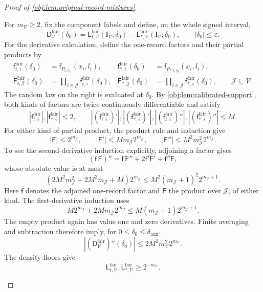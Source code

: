 \begin{proof}[Proof of \cref{obj:lem:original-record-mixtures}]
\begin{enumerate}
For \(m_{\mathcal V}\ge2\), fix the component labels and define, on the
whole signed interval,
\[
\mathsf D_{\mathcal V}^{\mathrm{fair}}(\delta_0)
=
\mathsf L_{t,\mathcal V}^{\mathrm{fair}}
(\boldsymbol l_{\mathcal V};\delta_0)
-
\mathsf L_{*,\mathcal V}^{\mathrm{fair}}
(\boldsymbol l_{\mathcal V};\delta_0),
\qquad |\delta_0|\le\varepsilon.
\]
For the derivative calculation, define the one-record factors and
their partial products by
\[
\begin{aligned}
\mathsf f_{t,i}^{\mathrm{fair}}(\delta_0)
&=\mathsf f_{P_{t,\widehat\sigma_{\mathcal V}}}(x_i,l_i),&
\mathsf f_{*,i}^{\mathrm{fair}}(\delta_0)
&=\mathsf f_{P_{*,t,\delta_0}}(x_i,l_i),\\
\mathsf F_{t,\mathcal J}^{\mathrm{fair}}(\delta_0)
&=\prod_{i\in\mathcal J}\mathsf f_{t,i}^{\mathrm{fair}}(\delta_0),&
\mathsf F_{*,\mathcal J}^{\mathrm{fair}}(\delta_0)
&=\prod_{i\in\mathcal J}\mathsf f_{*,i}^{\mathrm{fair}}(\delta_0),
\qquad \mathcal J\subseteq\mathcal V.
\end{aligned}
\]
The random law on the right is evaluated at \(\delta_0\). By
\cref{obj:lem:calibrated-support}, both kinds of factors are twice
continuously differentiable and satisfy
\[
|\mathsf f_{t,i}^{\mathrm{fair}}|,
|\mathsf f_{*,i}^{\mathrm{fair}}|\le2,\qquad
|(\mathsf f_{t,i}^{\mathrm{fair}})'|,
|(\mathsf f_{*,i}^{\mathrm{fair}})'|,
|(\mathsf f_{t,i}^{\mathrm{fair}})''|,
|(\mathsf f_{*,i}^{\mathrm{fair}})''|\le M.
\]
For either kind of partial product, the product rule and induction
give
\[
|\mathsf F|\le2^{m_{\mathcal J}},\qquad
|\mathsf F'|\le M m_{\mathcal J}2^{m_{\mathcal J}},\qquad
|\mathsf F''|\le M^2m_{\mathcal J}^2 2^{m_{\mathcal J}}.
\]
To see the second-derivative induction explicitly, adjoining a
factor gives
\[
(\mathsf f\,\mathsf F)''
=\mathsf f\,\mathsf F''+2\mathsf f'\mathsf F'
+\mathsf f''\mathsf F,
\]
whose absolute value is at most
\[
\left(2M^2m_{\mathcal J}^2+2M^2m_{\mathcal J}+M\right)
2^{m_{\mathcal J}}
\le
M^2(m_{\mathcal J}+1)^2 2^{m_{\mathcal J}+1}.
\]
Here \(\mathsf f\) denotes the adjoined one-record factor and
\(\mathsf F\) the product over \(\mathcal J\), of either kind. The
first-derivative induction uses
\[
M2^{m_{\mathcal J}}+
2M m_{\mathcal J}2^{m_{\mathcal J}}
\le M(m_{\mathcal J}+1)2^{m_{\mathcal J}+1}.
\]
The empty product again has value one and zero derivatives.
Finite averaging and subtraction therefore imply, for
\(0\le\delta_0\le\delta_{\mathrm{aux}}\),
\[
|(\mathsf D_{\mathcal V}^{\mathrm{fair}})''(\delta_0)|
\le2M^2m_{\mathcal V}^2 2^{m_{\mathcal V}}.
\]
The density floors give
\[
\mathsf L_{t,\mathcal V}^{\mathrm{fair}},
\mathsf L_{*,\mathcal V}^{\mathrm{fair}}
\ge2^{-m_{\mathcal V}}.
\]


\end{enumerate}
\end{proof}
